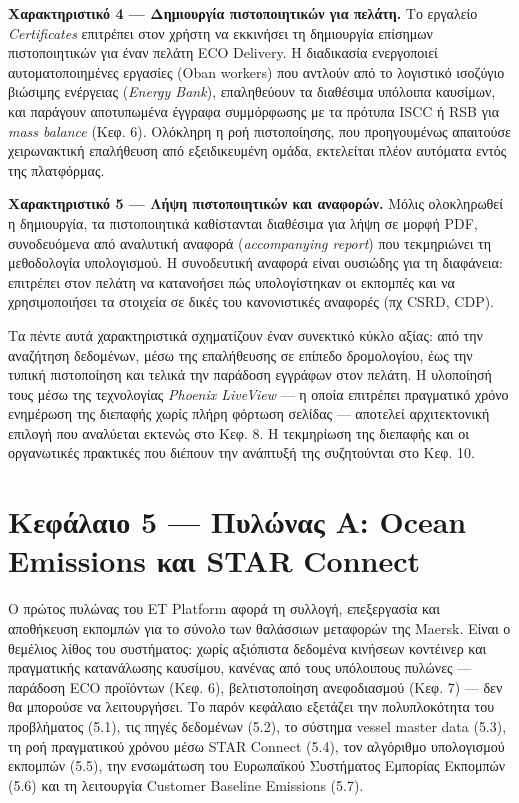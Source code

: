 \textbf{Χαρακτηριστικό 4 --- Δημιουργία πιστοποιητικών για πελάτη.} Το
εργαλείο \emph{Certificates} επιτρέπει στον χρήστη να εκκινήσει τη
δημιουργία επίσημων πιστοποιητικών για έναν πελάτη ECO Delivery. Η
διαδικασία ενεργοποιεί αυτοματοποιημένες εργασίες (Oban workers) που
αντλούν από το λογιστικό ισοζύγιο βιώσιμης ενέργειας (\emph{Energy
Bank}), επαληθεύουν τα διαθέσιμα υπόλοιπα καυσίμων, και παράγουν
αποτυπωμένα έγγραφα συμμόρφωσης με τα πρότυπα ISCC ή RSB για \emph{mass
balance} (Κεφ. 6). Ολόκληρη η ροή πιστοποίησης, που προηγουμένως
απαιτούσε χειρωνακτική επαλήθευση από εξειδικευμένη ομάδα, εκτελείται
πλέον αυτόματα εντός της πλατφόρμας.

\textbf{Χαρακτηριστικό 5 --- Λήψη πιστοποιητικών και αναφορών.} Μόλις
ολοκληρωθεί η δημιουργία, τα πιστοποιητικά καθίστανται διαθέσιμα για
λήψη σε μορφή PDF, συνοδευόμενα από αναλυτική αναφορά
(\emph{accompanying report}) που τεκμηριώνει τη μεθοδολογία υπολογισμού.
Η συνοδευτική αναφορά είναι ουσιώδης για τη διαφάνεια: επιτρέπει στον
πελάτη να κατανοήσει πώς υπολογίστηκαν οι εκπομπές και να χρησιμοποιήσει
τα στοιχεία σε δικές του κανονιστικές αναφορές (πχ CSRD, CDP).

Τα πέντε αυτά χαρακτηριστικά σχηματίζουν έναν συνεκτικό κύκλο αξίας: από
την αναζήτηση δεδομένων, μέσω της επαλήθευσης σε επίπεδο δρομολογίου,
έως την τυπική πιστοποίηση και τελικά την παράδοση εγγράφων στον πελάτη.
Η υλοποίησή τους μέσω της τεχνολογίας \emph{Phoenix LiveView} --- η
οποία επιτρέπει πραγματικό χρόνο ενημέρωση της διεπαφής χωρίς πλήρη
φόρτωση σελίδας --- αποτελεί αρχιτεκτονική επιλογή που αναλύεται εκτενώς
στο Κεφ. 8. Η τεκμηρίωση της διεπαφής και οι οργανωτικές πρακτικές που
διέπουν την ανάπτυξή της συζητούνται στο Κεφ. 10.

\pagebreak

\chapter{Κεφάλαιο 5 --- Πυλώνας Α: Ocean Emissions και STAR
Connect}\label{ux3baux3b5ux3c6ux3acux3bbux3b1ux3b9ux3bf-5-ux3c0ux3c5ux3bbux3ceux3bdux3b1ux3c2-ux3b1-ocean-emissions-ux3baux3b1ux3b9-star-connect}

Ο πρώτος πυλώνας του ET Platform αφορά τη συλλογή, επεξεργασία και
αποθήκευση εκπομπών για το σύνολο των θαλάσσιων μεταφορών της Maersk.
Είναι ο θεμέλιος λίθος του συστήματος: χωρίς αξιόπιστα δεδομένα κινήσεων
κοντέινερ και πραγματικής κατανάλωσης καυσίμου, κανένας από τους
υπόλοιπους πυλώνες --- παράδοση ECO προϊόντων (Κεφ. 6), βελτιστοποίηση
ανεφοδιασμού (Κεφ. 7) --- δεν θα μπορούσε να λειτουργήσει. Το παρόν
κεφάλαιο εξετάζει την πολυπλοκότητα του προβλήματος (5.1), τις πηγές
δεδομένων (5.2), το σύστημα vessel master data (5.3), τη ροή πραγματικού
χρόνου μέσω STAR Connect (5.4), τον αλγόριθμο υπολογισμού εκπομπών
(5.5), την ενσωμάτωση του Ευρωπαϊκού Συστήματος Εμπορίας Εκπομπών (5.6)
και τη λειτουργία Customer Baseline Emissions (5.7).

